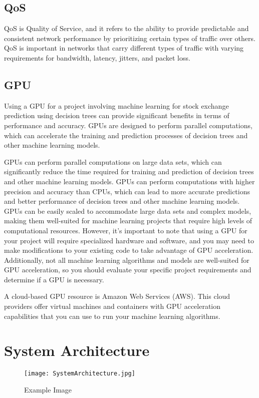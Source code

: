 \documentclass{article}
\begin{document}
\subsection{QoS}
QoS is Quality of Service, and it refers to the ability to provide predictable and consistent network performance by prioritizing certain types of traffic over others. QoS is important in networks that carry different types of traffic with varying requirements for bandwidth, latency, jitters, and packet loss.

\subsection{GPU}
Using a GPU for a project involving machine learning for stock exchange prediction using decision trees can provide significant benefits in terms of performance and accuracy. GPUs are designed to perform parallel computations, which can accelerate the training and prediction processes of decision trees and other machine learning models.

GPUs can perform parallel computations on large data sets, which can significantly reduce the time required for training and prediction of decision trees and other machine learning models.
GPUs can perform computations with higher precision and accuracy than CPUs, which can lead to more accurate predictions and better performance of decision trees and other machine learning models.
GPUs can be easily scaled to accommodate large data sets and complex models, making them well-suited for machine learning projects that require high levels of computational resources.
However, it's important to note that using a GPU for your project will require specialized hardware and software, and you may need to make modifications to your existing code to take advantage of GPU acceleration. Additionally, not all machine learning algorithms and models are well-suited for GPU acceleration, so you should evaluate your specific project requirements and determine if a GPU is necessary.

A cloud-based GPU resource is Amazon Web Services (AWS). This cloud providers offer virtual machines and containers with GPU acceleration capabilities that you can use to run your machine learning algorithms.

\section{System Architecture }
\begin{figure}[htbp]
  \centering
  \texttt{[image: SystemArchitecture.jpg]}
  \caption{Example Image}
  \label{fig:system architecture}
\end{figure}
\end{document}
